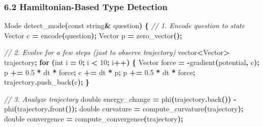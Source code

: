\documentclass[
  11pt,
  a4paper,
]{article}
\newenvironment{Shaded}{\begin{snugshade}}{\end{snugshade}}
\newcommand{\AttributeTok}[1]{\textcolor[rgb]{0.13,0.29,0.53}{#1}}
\newcommand{\CommentTok}[1]{\textcolor[rgb]{0.56,0.35,0.01}{\textit{#1}}}
\newcommand{\ControlFlowTok}[1]{\textcolor[rgb]{0.13,0.29,0.53}{\textbf{#1}}}
\newcommand{\DataTypeTok}[1]{\textcolor[rgb]{0.13,0.29,0.53}{#1}}
\newcommand{\DecValTok}[1]{\textcolor[rgb]{0.00,0.00,0.81}{#1}}
\newcommand{\FloatTok}[1]{\textcolor[rgb]{0.00,0.00,0.81}{#1}}
\newcommand{\NormalTok}[1]{#1}
\newcommand{\OperatorTok}[1]{\textcolor[rgb]{0.81,0.36,0.00}{\textbf{#1}}}
\begin{document}
\subsubsection{6.2 Hamiltonian-Based Type
Detection}\label{hamiltonian-based-type-detection-2}

\begin{Shaded}
\begin{Highlighting}[]
\NormalTok{Mode detect\_mode}\OperatorTok{(}\AttributeTok{const}\NormalTok{ string}\OperatorTok{\&}\NormalTok{ question}\OperatorTok{)} \OperatorTok{\{}
    \CommentTok{// 1. Encode question to state}
\NormalTok{    Vector c }\OperatorTok{=}\NormalTok{ encode}\OperatorTok{(}\NormalTok{question}\OperatorTok{);}
\NormalTok{    Vector p }\OperatorTok{=}\NormalTok{ zero\_vector}\OperatorTok{();}
    
    \CommentTok{// 2. Evolve for a few steps (just to observe trajectory)}
\NormalTok{    vector}\OperatorTok{\textless{}}\NormalTok{Vector}\OperatorTok{\textgreater{}}\NormalTok{ trajectory}\OperatorTok{;}
    \ControlFlowTok{for} \OperatorTok{(}\DataTypeTok{int}\NormalTok{ i }\OperatorTok{=} \DecValTok{0}\OperatorTok{;}\NormalTok{ i }\OperatorTok{\textless{}} \DecValTok{10}\OperatorTok{;}\NormalTok{ i}\OperatorTok{++)} \OperatorTok{\{}
\NormalTok{        Vector force }\OperatorTok{=} \OperatorTok{{-}}\NormalTok{gradient}\OperatorTok{(}\NormalTok{potential}\OperatorTok{,}\NormalTok{ c}\OperatorTok{);}
\NormalTok{        p }\OperatorTok{+=} \FloatTok{0.5} \OperatorTok{*}\NormalTok{ dt }\OperatorTok{*}\NormalTok{ force}\OperatorTok{;}
\NormalTok{        c }\OperatorTok{+=}\NormalTok{ dt }\OperatorTok{*}\NormalTok{ p}\OperatorTok{;}
\NormalTok{        p }\OperatorTok{+=} \FloatTok{0.5} \OperatorTok{*}\NormalTok{ dt }\OperatorTok{*}\NormalTok{ force}\OperatorTok{;}
\NormalTok{        trajectory}\OperatorTok{.}\NormalTok{push\_back}\OperatorTok{(}\NormalTok{c}\OperatorTok{);}
    \OperatorTok{\}}
    
    \CommentTok{// 3. Analyze trajectory}
    \DataTypeTok{double}\NormalTok{ energy\_change }\OperatorTok{=}\NormalTok{ phi}\OperatorTok{(}\NormalTok{trajectory}\OperatorTok{.}\NormalTok{back}\OperatorTok{())} \OperatorTok{{-}}\NormalTok{ phi}\OperatorTok{(}\NormalTok{trajectory}\OperatorTok{.}\NormalTok{front}\OperatorTok{());}
    \DataTypeTok{double}\NormalTok{ curvature }\OperatorTok{=}\NormalTok{ compute\_curvature}\OperatorTok{(}\NormalTok{trajectory}\OperatorTok{);}
    \DataTypeTok{double}\NormalTok{ convergence }\OperatorTok{=}\NormalTok{ compute\_convergence}\OperatorTok{(}\NormalTok{trajectory}\OperatorTok{);}
    

\end{Highlighting}
\end{Shaded}
\end{document}
